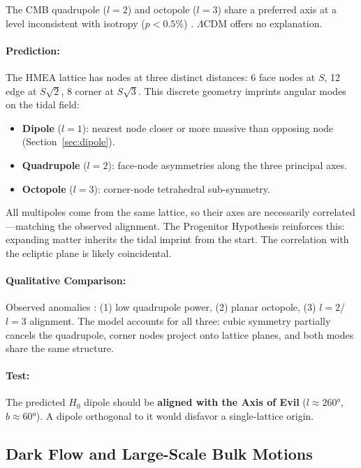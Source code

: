 \documentclass{article}
\begin{document}
The CMB quadrupole ($l=2$) and octopole ($l=3$) share a preferred axis at a level inconsistent with isotropy ($p < 0.5\%$) \cite{Land2005, deOliveiraCosta2004, Copi2006}.
$\Lambda$CDM offers no explanation.

\paragraph{Prediction:}
The HMEA lattice has nodes at three distinct distances: 6 face nodes at $S$, 12 edge at $S\sqrt{2}$, 8 corner at $S\sqrt{3}$.
This discrete geometry imprints angular modes on the tidal field:
\begin{itemize}
    \item \textbf{Dipole} ($l=1$): nearest node closer or more massive than opposing node (Section~\ref{sec:dipole}).
    \item \textbf{Quadrupole} ($l=2$): face-node asymmetries along the three principal axes.
    \item \textbf{Octopole} ($l=3$): corner-node tetrahedral sub-symmetry.
\end{itemize}

All multipoles come from the same lattice, so their axes are necessarily correlated—matching the observed alignment.
The Progenitor Hypothesis reinforces this: expanding matter inherits the tidal imprint from the start.
The correlation with the ecliptic plane is likely coincidental.

\paragraph{Qualitative Comparison:}
Observed anomalies \cite{Copi2010}: (1) low quadrupole power, (2) planar octopole, (3) $l=2$/$l=3$ alignment.
The model accounts for all three: cubic symmetry partially cancels the quadrupole, corner nodes project onto lattice planes, and both modes share the same structure.

\paragraph{Test:}
The predicted $H_0$ dipole should be \textbf{aligned with the Axis of Evil} ($l \approx 260°$, $b \approx 60°$).
A dipole orthogonal to it would disfavor a single-lattice origin.

\subsection{Dark Flow and Large-Scale Bulk Motions}
\label{sec:dark-flow}
\end{document}
